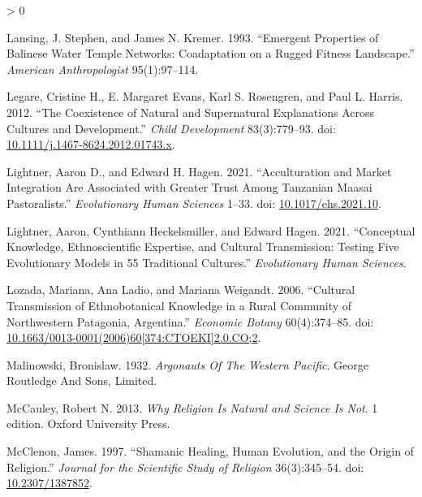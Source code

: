 \documentclass[
  11pt,
]{article}
\newlength{\cslhangindent}
\newenvironment{CSLReferences}[2] %
 {%
  \setlength{\parindent}{0pt}
  \ifodd #1 \everypar{\setlength{\hangindent}{\cslhangindent}}\ignorespaces\fi
  \ifnum #2 > 0
  \setlength{\parskip}{#2\baselineskip}
  \fi
 }%
 {}
\begin{document}
\begin{CSLReferences}{1}{0}
\leavevmode\hypertarget{ref-lansingEmergentPropertiesBalinese1993}{}%
Lansing, J. Stephen, and James N. Kremer. 1993. {``Emergent Properties of {Balinese} Water Temple Networks: Coadaptation on a Rugged Fitness Landscape.''} \emph{American Anthropologist} 95(1):97--114.

\leavevmode\hypertarget{ref-legareCoexistenceNaturalSupernatural2012}{}%
Legare, Cristine H., E. Margaret Evans, Karl S. Rosengren, and Paul L. Harris. 2012. {``The Coexistence of Natural and Supernatural Explanations Across Cultures and Development.''} \emph{Child Development} 83(3):779--93. doi: \href{https://doi.org/10.1111/j.1467-8624.2012.01743.x}{10.1111/j.1467-8624.2012.01743.x}.

\leavevmode\hypertarget{ref-lightnerAcculturationMarketIntegration2021}{}%
Lightner, Aaron D., and Edward H. Hagen. 2021. {``Acculturation and Market Integration Are Associated with Greater Trust Among {Tanzanian Maasai} Pastoralists.''} \emph{Evolutionary Human Sciences} 1--33. doi: \href{https://doi.org/10.1017/ehs.2021.10}{10.1017/ehs.2021.10}.

\leavevmode\hypertarget{ref-lightnerConceptualKnowledgeEthnoscientificinreview}{}%
Lightner, Aaron, Cynthiann Heckelsmiller, and Edward Hagen. 2021. {``Conceptual Knowledge, Ethnoscientific Expertise, and Cultural Transmission: {Testing} Five Evolutionary Models in 55 Traditional Cultures.''} \emph{Evolutionary Human Sciences}.

\leavevmode\hypertarget{ref-lozadaCulturalTransmissionEthnobotanical2006}{}%
Lozada, Mariana, Ana Ladio, and Mariana Weigandt. 2006. {``Cultural {Transmission} of {Ethnobotanical Knowledge} in a {Rural Community} of {Northwestern Patagonia}, {Argentina}.''} \emph{Economic Botany} 60(4):374--85. doi: \href{https://doi.org/10.1663/0013-0001(2006)60\%5B374:CTOEKI\%5D2.0.CO;2}{10.1663/0013-0001(2006)60{[}374:CTOEKI{]}2.0.CO;2}.

\leavevmode\hypertarget{ref-malinowskiArgonautsWesternPacific1932}{}%
Malinowski, Bronislaw. 1932. \emph{Argonauts {Of The Western Pacific}}. {George Routledge And Sons, Limited}.

\leavevmode\hypertarget{ref-mccauleyWhyReligionNatural2013}{}%
McCauley, Robert N. 2013. \emph{Why {Religion} Is {Natural} and {Science} Is {Not}}. 1 edition. {Oxford University Press}.

\leavevmode\hypertarget{ref-mcclenonShamanicHealingHuman1997}{}%
McClenon, James. 1997. {``Shamanic {Healing}, {Human Evolution}, and the {Origin} of {Religion}.''} \emph{Journal for the Scientific Study of Religion} 36(3):345--54. doi: \href{https://doi.org/10.2307/1387852}{10.2307/1387852}.


\end{CSLReferences}
\end{document}
